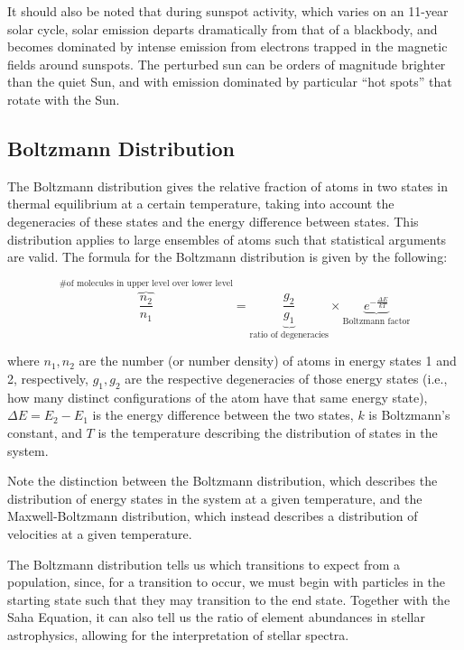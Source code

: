 \documentclass{article}
\begin{document}
It should also be noted that during sunspot activity, which varies on an 11-year solar cycle, solar emission departs dramatically from that of a blackbody, and becomes dominated by intense emission from electrons trapped in the magnetic fields around sunspots.  The perturbed sun can be orders of magnitude brighter than the quiet Sun, and with emission dominated by particular ``hot spots'' that rotate with the Sun.


\subsection{Boltzmann Distribution}

The Boltzmann distribution gives the relative fraction of atoms in two states in thermal equilibrium at a certain temperature, taking into account the degeneracies of these states and the energy difference between states. This distribution applies to large ensembles of atoms such that statistical arguments are valid. The formula for the Boltzmann distribution is given by the following:

\begin{equation}
\boxed{\overbrace{\frac{n_2}{n_1}}^\text{\# of molecules  in upper level over lower level}=\underbrace{\frac{g_2}{g_1}}_{\text{ratio of degeneracies}} \times \underbrace{e^{-\frac{\Delta E}{kT}}}_{\text{Boltzmann factor}}}
\end{equation}

where $n_1,n_2$ are the number (or number density) of atoms in energy states 1 and 2, respectively, $g_1,g_2$ are the respective degeneracies of those energy states (i.e., how many distinct configurations of the atom have that same energy state), $\Delta E=E_2-E_1$ is the energy difference between the two states, $k$ is Boltzmann's constant, and $T$ is the temperature describing the distribution of states in the system.

Note the distinction between the Boltzmann distribution, which describes the distribution of energy states in the system at a given temperature, and the Maxwell-Boltzmann distribution, which instead describes a distribution of velocities at a given temperature.

The Boltzmann distribution tells us which transitions to expect from a population, since, for a transition to occur, we must begin with particles in the starting state such that they may transition to the end state. Together with the Saha Equation, it can also tell us the ratio of element abundances in stellar astrophysics, allowing for the interpretation of stellar spectra.
\end{document}

